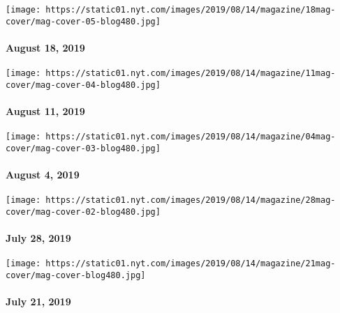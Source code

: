 \href{https://www.nytimes.com/interactive/2019/08/14/magazine/1619-america-slavery.html}{}

\texttt{[image: https://static01.nyt.com/images/2019/08/14/magazine/18mag-cover/mag-cover-05-blog480.jpg]}

\hypertarget{august-18-2019}{%
\paragraph{August 18, 2019}\label{august-18-2019}}

\href{https://www.nytimes.com/issue/magazine/2019/08/14/the-81119-issue}{}

\texttt{[image: https://static01.nyt.com/images/2019/08/14/magazine/11mag-cover/mag-cover-04-blog480.jpg]}

\hypertarget{august-11-2019}{%
\paragraph{August 11, 2019}\label{august-11-2019}}

\href{https://www.nytimes.com/issue/magazine/2019/08/14/the-8419-issue}{}

\texttt{[image: https://static01.nyt.com/images/2019/08/14/magazine/04mag-cover/mag-cover-03-blog480.jpg]}

\hypertarget{august-4-2019}{%
\paragraph{August 4, 2019}\label{august-4-2019}}

\href{https://www.nytimes.com/issue/magazine/2019/08/14/the-72819-issue}{}

\texttt{[image: https://static01.nyt.com/images/2019/08/14/magazine/28mag-cover/mag-cover-02-blog480.jpg]}

\hypertarget{july-28-2019}{%
\paragraph{July 28, 2019}\label{july-28-2019}}

\href{https://www.nytimes.com/issue/magazine/2019/08/14/the-72119-issue}{}

\texttt{[image: https://static01.nyt.com/images/2019/08/14/magazine/21mag-cover/mag-cover-blog480.jpg]}

\hypertarget{july-21-2019}{%
\paragraph{July 21, 2019}\label{july-21-2019}}

